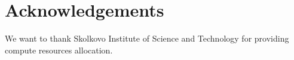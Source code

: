 \section*{Acknowledgements}
We want to thank Skolkovo Institute of Science and Technology for providing compute resources allocation.
